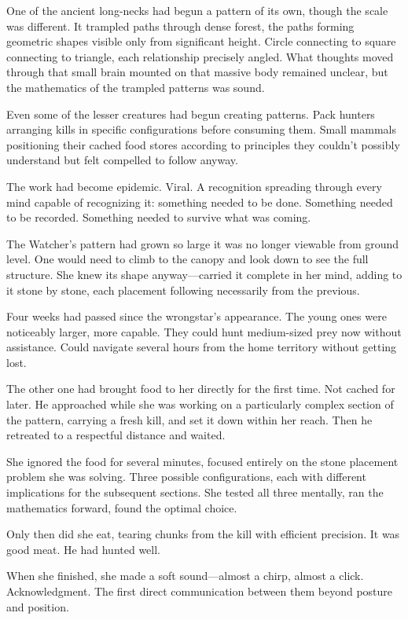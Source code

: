 One of the ancient long-necks had begun a pattern of its own, though the scale was different. It trampled paths through dense forest, the paths forming geometric shapes visible only from significant height. Circle connecting to square connecting to triangle, each relationship precisely angled. What thoughts moved through that small brain mounted on that massive body remained unclear, but the mathematics of the trampled patterns was sound.

Even some of the lesser creatures had begun creating patterns. Pack hunters arranging kills in specific configurations before consuming them. Small mammals positioning their cached food stores according to principles they couldn't possibly understand but felt compelled to follow anyway.

The work had become epidemic. Viral. A recognition spreading through every mind capable of recognizing it: something needed to be done. Something needed to be recorded. Something needed to survive what was coming.

\scenebreak

The Watcher's pattern had grown so large it was no longer viewable from ground level. One would need to climb to the canopy and look down to see the full structure. She knew its shape anyway—carried it complete in her mind, adding to it stone by stone, each placement following necessarily from the previous.

Four weeks had passed since the wrongstar's appearance. The young ones were noticeably larger, more capable. They could hunt medium-sized prey now without assistance. Could navigate several hours from the home territory without getting lost.

The other one had brought food to her directly for the first time. Not cached for later. He approached while she was working on a particularly complex section of the pattern, carrying a fresh kill, and set it down within her reach. Then he retreated to a respectful distance and waited.

She ignored the food for several minutes, focused entirely on the stone placement problem she was solving. Three possible configurations, each with different implications for the subsequent sections. She tested all three mentally, ran the mathematics forward, found the optimal choice.

Only then did she eat, tearing chunks from the kill with efficient precision. It was good meat. He had hunted well.

When she finished, she made a soft sound—almost a chirp, almost a click. Acknowledgment. The first direct communication between them beyond posture and position.

